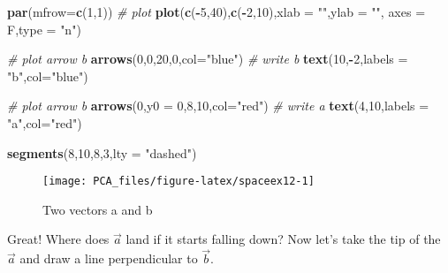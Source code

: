 \documentclass[
]{book}
\newenvironment{Shaded}{\begin{snugshade}}{\end{snugshade}}
\newcommand{\CommentTok}[1]{\textcolor[rgb]{0.56,0.35,0.01}{\textit{#1}}}
\newcommand{\DataTypeTok}[1]{\textcolor[rgb]{0.13,0.29,0.53}{#1}}
\newcommand{\DecValTok}[1]{\textcolor[rgb]{0.00,0.00,0.81}{#1}}
\newcommand{\KeywordTok}[1]{\textcolor[rgb]{0.13,0.29,0.53}{\textbf{#1}}}
\newcommand{\NormalTok}[1]{#1}
\newcommand{\OperatorTok}[1]{\textcolor[rgb]{0.81,0.36,0.00}{\textbf{#1}}}
\newcommand{\StringTok}[1]{\textcolor[rgb]{0.31,0.60,0.02}{#1}}
\theoremstyle{definition}
\theoremstyle{definition}
\theoremstyle{definition}
\theoremstyle{remark}
\begin{document}
\begin{Shaded}
\begin{Highlighting}[]
\KeywordTok{par}\NormalTok{(}\DataTypeTok{mfrow=}\KeywordTok{c}\NormalTok{(}\DecValTok{1}\NormalTok{,}\DecValTok{1}\NormalTok{))}
\CommentTok{# plot}
\KeywordTok{plot}\NormalTok{(}\KeywordTok{c}\NormalTok{(}\OperatorTok{-}\DecValTok{5}\NormalTok{,}\DecValTok{40}\NormalTok{),}\KeywordTok{c}\NormalTok{(}\OperatorTok{-}\DecValTok{2}\NormalTok{,}\DecValTok{10}\NormalTok{),}\DataTypeTok{xlab =} \StringTok{""}\NormalTok{,}\DataTypeTok{ylab =} \StringTok{""}\NormalTok{,}
 \DataTypeTok{axes =}\NormalTok{ F,}\DataTypeTok{type =} \StringTok{"n"}\NormalTok{)}


\CommentTok{# plot arrow b}
\KeywordTok{arrows}\NormalTok{(}\DecValTok{0}\NormalTok{,}\DecValTok{0}\NormalTok{,}\DecValTok{20}\NormalTok{,}\DecValTok{0}\NormalTok{,}\DataTypeTok{col=}\StringTok{"blue"}\NormalTok{)}
\CommentTok{# write b}
\KeywordTok{text}\NormalTok{(}\DecValTok{10}\NormalTok{,}\OperatorTok{-}\DecValTok{2}\NormalTok{,}\DataTypeTok{labels =} \StringTok{"b"}\NormalTok{,}\DataTypeTok{col=}\StringTok{"blue"}\NormalTok{)}


\CommentTok{# plot arrow b}
\KeywordTok{arrows}\NormalTok{(}\DecValTok{0}\NormalTok{,}\DataTypeTok{y0 =} \DecValTok{0}\NormalTok{,}\DecValTok{8}\NormalTok{,}\DecValTok{10}\NormalTok{,}\DataTypeTok{col=}\StringTok{"red"}\NormalTok{)}
\CommentTok{# write a}
\KeywordTok{text}\NormalTok{(}\DecValTok{4}\NormalTok{,}\DecValTok{10}\NormalTok{,}\DataTypeTok{labels =} \StringTok{"a"}\NormalTok{,}\DataTypeTok{col=}\StringTok{"red"}\NormalTok{)}

\KeywordTok{segments}\NormalTok{(}\DecValTok{8}\NormalTok{,}\DecValTok{10}\NormalTok{,}\DecValTok{8}\NormalTok{,}\DecValTok{3}\NormalTok{,}\DataTypeTok{lty =} \StringTok{"dashed"}\NormalTok{)}
\end{Highlighting}
\end{Shaded}

\begin{figure}

{\centering \texttt{[image: PCA\_files/figure-latex/spaceex12-1]} 

}

\caption{Two vectors a and b}\label{fig:spaceex12}
\end{figure}

Great! Where does \(\vec{a}\) land if it starts falling down? Now let's take the tip of the \(\vec{a}\) and draw a line perpendicular to \(\vec{b}\).
\end{document}
